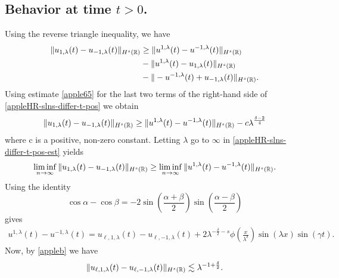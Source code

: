 \subsection*{Behavior at time  $t>0$.}  Using the reverse triangle inequality, we 
have
%
%
%
%
%
\begin{equation} \label{appleHR-slns-differ-t-pos}
\begin{split}
\|
u_{1,\lambda}(t)
-
u_{- 1,\lambda}(t)
\|_{H^s(\mathbb{R})}
&
\ge
\|
u^{1,\lambda}(t)
-
u^{- 1,\lambda}(t)
\|_{H^s(\mathbb{R})}
\\
& -
\|
u^{1,\lambda}(t)
-
u_{1,\lambda}(t)
\|_{H^s(\mathbb{R})}
\\
& -
\|
-u^{-1,\lambda}(t)
+
u_{-1,\lambda}(t)
\|_{H^s(\mathbb{R})}.
\end{split}
\end{equation}
%
%
%
%
Using estimate \eqref{apple65} for the last two terms of 
the right-hand side of \eqref{appleHR-slns-differ-t-pos} we obtain
%
%
%
%
%
\begin{equation} \label{appleHR-slns-differ-t-pos-est}
\|
u_{1,\lambda}(t)
-
u_{- 1,\lambda}(t)
\|_{H^s(\mathbb{R})}
\ge
\|
u^{1,\lambda}(t)
-
u^{- 1,\lambda}(t)
\|_{H^s(\mathbb{R})}
-
c \lambda^{\frac{\delta - 2}{4}}
\end{equation}
%
%
where c is a positive, non-zero constant. Letting $\lambda$ go to $\infty$ 
in
\eqref{appleHR-slns-differ-t-pos-est}
yields
%
%
%
\begin{equation} \label{appleHR-slns-to-ap-est}
\liminf_{n\to\infty}
\|
u_{1,\lambda}(t)
-
u_{- 1,\lambda}(t)
\|_{H^s(\mathbb{R})}
\ge
\liminf_{n\to\infty}
\|
u^{1,\lambda}(t)
-
u^{- 1,\lambda}(t)
\|_{H^s(\mathbb{R})}.
\end{equation}
%
%
%
%
Using the identity $$
\cos \alpha -\cos \beta
=
-2
\sin(\frac{\alpha + \beta}{2})
\sin(\frac{\alpha - \beta}{2})
$$
gives
%
%
\begin{equation}
\label{apple80}
\begin{split}
u^{1,\lambda}(t)
-
u^{- 1,\lambda}(t)
=
u_{\ell,1,\lambda}(t) - u_{\ell,-1,\lambda}(t) + 
2\lambda^{-\frac{\delta}{2}-s}
\phi\left( \frac{x}{\lambda^\delta} \right)\sin(\lambda x) \sin(\gamma t).
\end{split}
\end{equation}
%
%
Now, by  \cref{appleb} we have
%
%
\begin{equation*}
\begin{split}
\|u_{\ell,1,\lambda}(t) - u_{\ell,-1,\lambda}(t)\|_{H^s(\mathbb{R})} \lesssim
\lambda^{-1 + \frac{\delta}{2}}.
\end{split}
\end{equation*}
